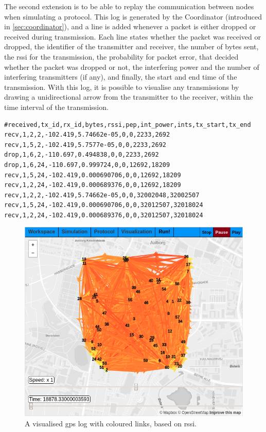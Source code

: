 The second extension is to be able to replay the communication between nodes when simulating a protocol. This
log is generated by the Coordinator (introduced in \autoref{sec:coordinator}), and a line is added whenever a
packet is either dropped or received during transmission. Each line states whether the packet was received
or dropped, the identifier of the transmitter and receiver, the number of bytes sent, the \gls{rssi} for the
transmission, the probability for packet error, that decided whether the packet was dropped or not, the
interfering power and the number of interfering transmitters (if any), and finally, the start and end time of
the transmission. With this log, it is possible to visualise any transmissions by drawing a unidirectional
arrow from the transmitter to the receiver, within the time interval of the transmission.
%
\begin{verbatim}
#received,tx_id,rx_id,bytes,rssi,pep,int_power,ints,tx_start,tx_end
recv,1,2,2,-102.419,5.74662e-05,0,0,2233,2692
recv,1,5,2,-102.419,5.7577e-05,0,0,2233,2692
drop,1,6,2,-110.697,0.494838,0,0,2233,2692
drop,1,6,24,-110.697,0.999724,0,0,12692,18209
recv,1,5,24,-102.419,0.000690706,0,0,12692,18209
recv,1,2,24,-102.419,0.000689376,0,0,12692,18209
recv,1,2,2,-102.419,5.74662e-05,0,0,32002048,32002507
recv,1,5,24,-102.419,0.000690706,0,0,32012507,32018024
recv,1,2,24,-102.419,0.000689376,0,0,32012507,32018024
\end{verbatim}

\begin{figure}[H]
    \centering
    \includegraphics[width=.8\textwidth]{figures/visualiser/gpslog+rssi.png}
    \caption{A visualised \acrshort{gps} log with coloured links, based on \gls{rssi}.}
    \label{figure:gpslogrssivisualised}
\end{figure}
%

